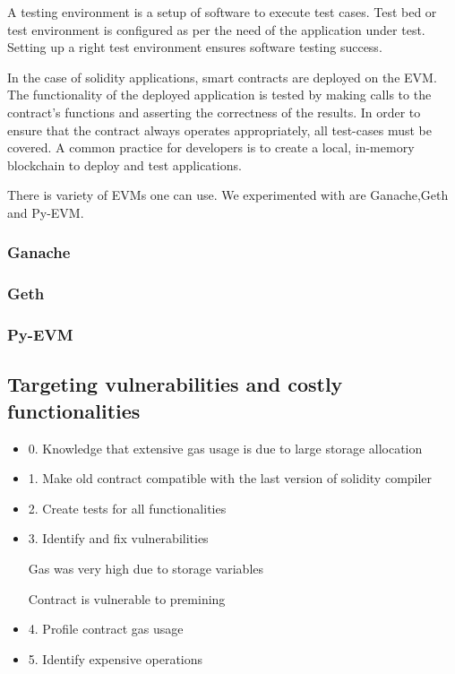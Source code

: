 \documentclass{article}
\begin{document}
  A testing environment is a setup of software to execute test cases.
  Test bed or test environment is configured as per the need of the
  application under test. Setting up a right test environment ensures
  software testing success.

  In the case of solidity applications, smart contracts are deployed on
  the EVM. The functionality of the deployed application is tested by
  making calls to the contract's functions and asserting the correctness
  of the results. In order to ensure that the contract always operates
  appropriately, all test-cases must be covered. A common practice for
  developers is to create a local, in-memory blockchain to deploy and
  test applications.

  There is variety of EVMs one can use. We experimented with are
  Ganache,Geth and Py-EVM.

  \subsubsection{Ganache}

  \subsubsection{Geth}

  \subsubsection{Py-EVM}

  \subsection{Targeting vulnerabilities and costly functionalities}

  \begin{itemize}
  \item
    0. Knowledge that extensive gas usage is due to large storage
    allocation
  \item
    1. Make old contract compatible with the last version of solidity
    compiler
  \item
    2. Create tests for all functionalities
  \item
    3. Identify and fix vulnerabilities

    Gas was very high due to storage variables

    Contract is vulnerable to premining
  \item
    4. Profile contract gas usage
  \item
    5. Identify expensive operations
  \end{itemize}
\end{document}
